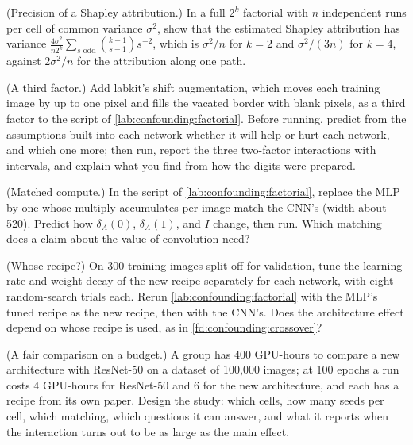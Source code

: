 \begin{refsection}
\begin{exercises}
\item \consolidation\hard (Precision of a Shapley attribution.) In a full $2^k$ factorial with $n$ independent runs per cell of common variance $\sigma^2$, show that the estimated Shapley attribution has variance $\frac{4\sigma^2}{n2^k}\sum_{s\text{ odd}}\binom{k-1}{s-1}s^{-2}$, which is $\sigma^2/n$ for $k=2$ and $\sigma^2/(3n)$ for $k=4$, against $2\sigma^2/n$ for the attribution along one path. \label{ex:confounding:shapleyvar}

\item \labwork (A third factor.) Add labkit's shift augmentation, which moves each training image by up to one pixel and fills the vacated border with blank pixels, as a third factor to the script of \cref{lab:confounding:factorial}. Before running, predict from the assumptions built into each network whether it will help or hurt each network, and which one more; then run, report the three two-factor interactions with intervals, and explain what you find from how the digits were prepared.\label{ex:confounding:augment}

\item \labwork (Matched compute.) In the script of \cref{lab:confounding:factorial}, replace the MLP by one whose multiply-accumulates per image match the CNN's (width about 520). Predict how $\delta_A(0)$, $\delta_A(1)$, and $I$ change, then run. Which matching does a claim about the value of convolution need?\label{ex:confounding:compute}

\item \labwork (Whose recipe?) On 300 training images split off for validation, tune the learning rate and weight decay of the new recipe separately for each network, with eight random-search trials each. Rerun \cref{lab:confounding:factorial} with the MLP's tuned recipe as the new recipe, then with the CNN's. Does the architecture effect depend on whose recipe is used, as in \cref{fd:confounding:crossover}?\label{ex:confounding:whose}

\item \design (A fair comparison on a budget.) A group has 400 GPU-hours to compare a new architecture with ResNet-50 on a dataset of 100,000 images; at 100 epochs a run costs 4 GPU-hours for ResNet-50 and 6 for the new architecture, and each has a recipe from its own paper. Design the study: which cells, how many seeds per cell, which matching, which questions it can answer, and what it reports when the interaction turns out to be as large as the main effect.\label{ex:confounding:budget}


\end{exercises}
\end{refsection}

